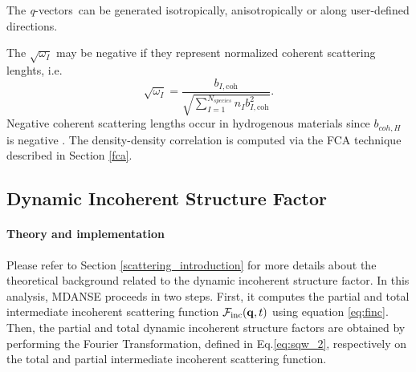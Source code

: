 \documentclass[a4paper,11pt]{article}
\newcommand{\qvects}{\textit{q}-vectors}
\begin{document}
The \qvects\ can be generated isotropically, anisotropically or along user-defined directions.

The $\sqrt{\omega_I}$ may be negative if they represent normalized coherent scattering lenghts, i.e.
\begin{equation}
\sqrt{\omega_I} = \frac{b_{I,\mathrm{coh}}}{\sqrt{\sum\limits_{I = 1}^{N_{species}} n_I b^2_{I,\mathrm{coh}}}}.
\end{equation}
Negative coherent scattering lengths occur in hydrogenous materials since $b_{coh,H}$ is negative \cite{Lovesey}.
The density-density correlation is computed via the \gls{FCA} technique described in Section \ref{fca}.


\subsection{Dynamic Incoherent Structure Factor}
\label{disf}
\paragraph{Theory and implementation\\}
\label{disf_theory}
Please refer to Section \ref{scattering_introduction} for more details about the theoretical background related to the dynamic
incoherent structure factor. In this analysis, \gls{MDANSE} proceeds in two steps. First, it computes the partial and total
intermediate incoherent scattering function ${\cal F}_{\mathrm{inc}}({\bf q},t)$ using equation \ref{eq:finc}. Then, the partial
and total dynamic incoherent structure factors are obtained by performing the Fourier Transformation, defined
in Eq.\ref{eq:sqw_2}, respectively on the total and partial intermediate incoherent scattering function.
\end{document}
